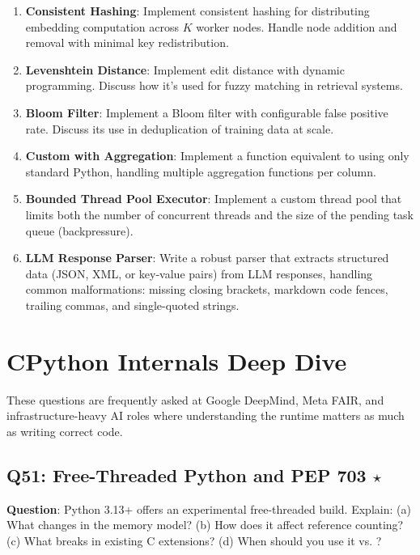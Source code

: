 \begin{enumerate}[leftmargin=*]
    \item[Q45.] \textbf{Consistent Hashing}: Implement consistent hashing for distributing embedding computation across $K$ worker nodes. Handle node addition and removal with minimal key redistribution.

    \item[Q46.] \textbf{Levenshtein Distance}: Implement edit distance with dynamic programming. Discuss how it's used for fuzzy matching in retrieval systems.

    \item[Q47.] \textbf{Bloom Filter}: Implement a Bloom filter with configurable false positive rate. Discuss its use in deduplication of training data at scale.

    \item[Q48.] \textbf{Custom  with Aggregation}: Implement a function equivalent to  using only standard Python, handling multiple aggregation functions per column.

    \item[Q49.] \textbf{Bounded Thread Pool Executor}: Implement a custom thread pool that limits both the number of concurrent threads and the size of the pending task queue (backpressure).

    \item[Q50.] \textbf{LLM Response Parser}: Write a robust parser that extracts structured data (JSON, XML, or key-value pairs) from LLM responses, handling common malformations: missing closing brackets, markdown code fences, trailing commas, and single-quoted strings.
\end{enumerate}


\section{CPython Internals Deep Dive}

These questions are frequently asked at Google DeepMind, Meta FAIR, and infrastructure-heavy AI roles where understanding the runtime matters as much as writing correct code.

\subsection{Q51: Free-Threaded Python and PEP 703 $\star$}

\textbf{Question}: Python 3.13+ offers an experimental free-threaded build. Explain: (a) What changes in the memory model? (b) How does it affect reference counting? (c) What breaks in existing C extensions? (d) When should you use it vs. ?

